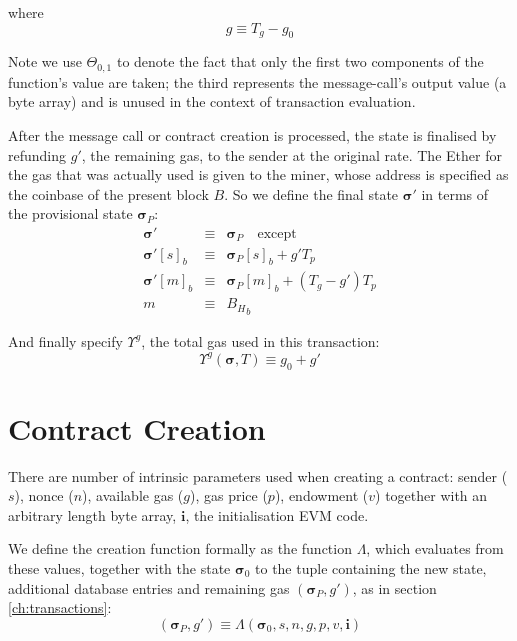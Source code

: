 \documentclass[9pt,oneside]{amsart}
\begin{document}
\begin{multicols}{2}
where
\begin{equation}
g \equiv T_g - g_0
\end{equation}

Note we use $\Theta_{0,1}$ to denote the fact that only the first two components of the function's value are taken; the third represents the message-call's output value (a byte array) and is unused in the context of transaction evaluation.

After the message call or contract creation is processed, the state is finalised by refunding $g'$, the remaining gas, to the sender at the original rate. The Ether for the gas that was actually used is given to the miner, whose address is specified as the coinbase of the present block $B$. So we define the final state $\boldsymbol{\sigma}'$ in terms of the provisional state $\boldsymbol{\sigma}_P$:
\begin{eqnarray}
\boldsymbol{\sigma}' & \equiv & \boldsymbol{\sigma}_P \quad \text{except} \\
\boldsymbol{\sigma}'[s]_b & \equiv & \boldsymbol{\sigma}_P[s]_b + g' T_p \\
\boldsymbol{\sigma}'[m]_b & \equiv & \boldsymbol{\sigma}_P[m]_b + (T_g - g') T_p \\
m & \equiv & {B_H}_b
\end{eqnarray}

And finally specify $\Upsilon^g$, the total gas used in this transaction:
\begin{equation}
\Upsilon^g(\boldsymbol{\sigma}, T) \equiv g_0 + g'
\end{equation}


\section{Contract Creation} \label{ch:create}

There are number of intrinsic parameters used when creating a contract: sender ($s$), nonce ($n$), available gas ($g$), gas price ($p$), endowment ($v$) together with an arbitrary length byte array, $\mathbf{i}$, the initialisation EVM code.

We define the creation function formally as the function $\Lambda$, which evaluates from these values, together with the state $\boldsymbol{\sigma}_0$ to the tuple containing the new state, additional database entries and remaining gas $(\boldsymbol{\sigma}_P, g')$, as in section \ref{ch:transactions}:
\begin{equation}
(\boldsymbol{\sigma}_P, g') \equiv \Lambda(\boldsymbol{\sigma}_0, s, n, g, p, v, \mathbf{i})
\end{equation}


\end{multicols}
\end{document}
